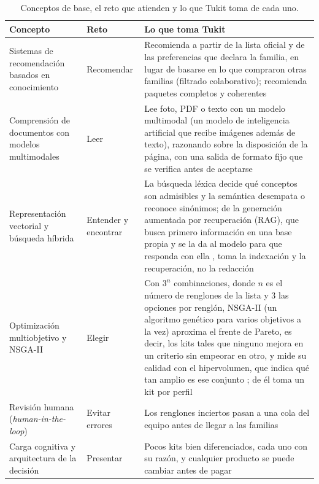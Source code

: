 \begin{table}[htbp]
\centering
\scriptsize
\caption{Conceptos de base, el reto que atienden y lo que Tukit toma de cada uno.}
\label{tab:antecedentes}
\begin{tabularx}{\textwidth}{@{}p{3.2cm}p{2.2cm}X@{}}
\toprule
Concepto & Reto & Lo que toma Tukit \\
\midrule
Sistemas de recomendación basados en conocimiento \citep{adomavicius_toward_2005,burke_hybrid_2002} &
Recomendar & Recomienda a partir de la lista oficial y de las preferencias que declara la familia, en lugar de basarse
en lo que compraron otras familias (filtrado colaborativo); recomienda paquetes completos y coherentes \citep{avny_brosh_bruce_2022} \\
Comprensión de documentos con modelos multimodales \citep{shen_ocr_2026,liu_ocrbench_2024} & Leer &
Lee foto, PDF o texto con un modelo multimodal (un modelo de inteligencia artificial que recibe imágenes
además de texto), razonando sobre la disposición de la página, con una salida de formato fijo que se
verifica antes de aceptarse \\
Representación vectorial y búsqueda híbrida \citep{reimers_sentence-bert_2019,karpukhin_dense_2020} &
Entender y encontrar & La búsqueda léxica decide qué conceptos son admisibles y la semántica desempata
o reconoce sinónimos; de la generación aumentada por recuperación (RAG), que busca primero información en
una base propia y se la da al modelo para que responda con ella \citep{lewis_retrieval-augmented_2020},
toma la indexación y la recuperación, no la redacción \\
Optimización multiobjetivo y NSGA-II \citep{ehrgott_multiobjective_2002,deb_fast_2002} & Elegir & Con
$3^{n}$ combinaciones, donde $n$ es el número de renglones de la lista y 3 las opciones por renglón,
NSGA-II (un algoritmo genético para varios objetivos a la vez) aproxima el frente de Pareto, es decir,
los kits tales que ninguno mejora en un criterio sin empeorar en otro, y mide su calidad con el
hipervolumen, que indica qué tan amplio es ese conjunto \citep{zitzler_multiobjective_1999}; de él toma
un kit por perfil \\
Revisión humana (\emph{human-in-the-loop}) \citep{amershi_guidelines_2019} & Evitar errores & Los
renglones inciertos pasan a una cola del equipo antes de llegar a las familias \\
Carga cognitiva y arquitectura de la decisión \citep{sweller_cognitive_2011,iyengar_when_2000,thaler_nudge_2008}
& Presentar & Pocos kits bien diferenciados, cada uno con su razón, y cualquier producto se puede
cambiar antes de pagar \\
\bottomrule
\end{tabularx}
\end{table}

